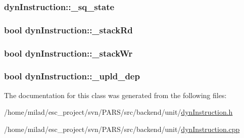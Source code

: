 \hypertarget{classdynInstruction_a99a8a46f48d06ff4bc88499efc685906}{
\subsubsection[{\_\-sq\_\-state}]{ {\bf dynInstruction::\_\-sq\_\-state}}}
\label{classdynInstruction_a99a8a46f48d06ff4bc88499efc685906}
\hypertarget{classdynInstruction_ad6650905d355b9bd11821572eb5c449b}{
\subsubsection[{\_\-stackRd}]{\setlength{\rightskip}{0pt plus 5cm}bool {\bf dynInstruction::\_\-stackRd}}}
\label{classdynInstruction_ad6650905d355b9bd11821572eb5c449b}
\hypertarget{classdynInstruction_a8ae8b2d882d79e89310ebaedb9b6408f}{
\subsubsection[{\_\-stackWr}]{\setlength{\rightskip}{0pt plus 5cm}bool {\bf dynInstruction::\_\-stackWr}}}
\label{classdynInstruction_a8ae8b2d882d79e89310ebaedb9b6408f}
\hypertarget{classdynInstruction_a68be14704fc772703ec5c2996ab157e6}{
\subsubsection[{\_\-upld\_\-dep}]{\setlength{\rightskip}{0pt plus 5cm}bool {\bf dynInstruction::\_\-upld\_\-dep}}}
\label{classdynInstruction_a68be14704fc772703ec5c2996ab157e6}


The documentation for this class was generated from the following files:\begin{DoxyCompactItemize}
\item 
/home/milad/esc\_\-project/svn/PARS/src/backend/unit/\hyperlink{dynInstruction_8h}{dynInstruction.h}\item 
/home/milad/esc\_\-project/svn/PARS/src/backend/unit/\hyperlink{dynInstruction_8cpp}{dynInstruction.cpp}\end{DoxyCompactItemize}
